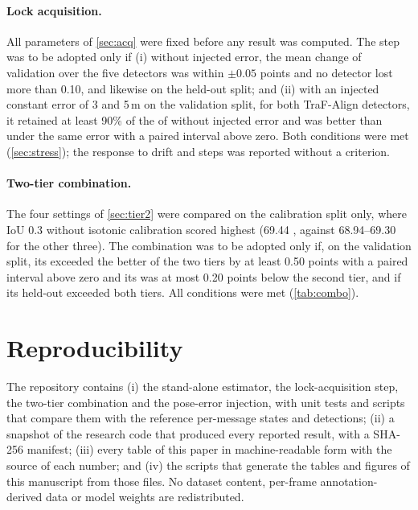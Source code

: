 \paragraph{Lock acquisition.}
All parameters of \cref{sec:acq} were fixed before any result was computed.
The step was to be adopted only if (i) without injected error, the mean change of validation \apseven over the five detectors was within $\pm0.05$ points and no detector lost more than 0.10, and likewise on the held-out split; and (ii) with an injected constant error of 3 and 5\,m on the validation split, for both TraF-Align detectors, it retained at least 90\% of the \apseven of \method without injected error and was better than \method under the same error with a paired interval above zero.
Both conditions were met (\cref{sec:stress}); the response to drift and steps was reported without a criterion.

\paragraph{Two-tier combination.}
The four settings of \cref{sec:tier2} were compared on the calibration split only, where IoU 0.3 without isotonic calibration scored highest (69.44 \apseven, against 68.94--69.30 for the other three).
The combination was to be adopted only if, on the validation split, its \apseven exceeded the better of the two tiers by at least 0.50 points with a paired interval above zero and its \apfive was at most 0.20 points below the second tier, and if its held-out \apseven exceeded both tiers.
All conditions were met (\cref{tab:combo}).

\section{Reproducibility}
\label{app:repro}
The repository contains (i) the stand-alone estimator, the lock-acquisition step, the two-tier combination and the pose-error injection, with unit tests and scripts that compare them with the reference per-message states and detections; (ii) a snapshot of the research code that produced every reported result, with a SHA-256 manifest; (iii) every table of this paper in machine-readable form with the source of each number; and (iv) the scripts that generate the tables and figures of this manuscript from those files.
No dataset content, per-frame annotation-derived data or model weights are redistributed.
